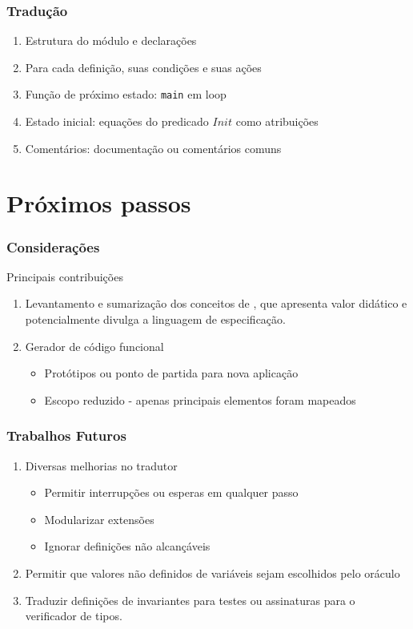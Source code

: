 \documentclass{beamer}
\begin{document}
\begin{frame}
  \frametitle{Tradução}

  \begin{enumerate}
    \item Estrutura do módulo e declarações

    \item Para cada definição, suas condições e suas ações

    \item Função de próximo estado: \texttt{main} em loop

    \item Estado inicial: equações do predicado $Init$ como atribuições

    \item Comentários: documentação ou comentários comuns

  \end{enumerate}
\end{frame}

\section{Próximos passos}

\begin{frame}
  \frametitle{Considerações}

  Principais contribuições
  \begin{enumerate}
    \item Levantamento e sumarização dos conceitos de \TLAA, que apresenta valor
      didático e potencialmente divulga a linguagem de especificação.
    \item Gerador de código funcional
      \begin{itemize}
        \item Protótipos ou ponto de partida para nova aplicação
        \item Escopo reduzido - apenas principais elementos foram mapeados
      \end{itemize}
  \end{enumerate}

\end{frame}

\begin{frame}
  \frametitle{Trabalhos Futuros}
  \begin{enumerate}
    \item Diversas melhorias no tradutor
    \begin{itemize}
        \item Permitir interrupções ou esperas em qualquer passo
        \item Modularizar extensões
        \item Ignorar definições não alcançáveis
        \end{itemize}
    \item Permitir que valores não definidos de variáveis sejam escolhidos
      pelo oráculo
    \item Traduzir definições de invariantes para testes ou assinaturas para o
      verificador de tipos.
  \end{enumerate}
\end{frame}
\end{document}
